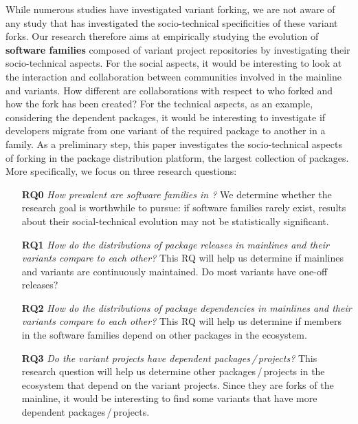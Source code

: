 While numerous studies have investigated variant forking, we are not aware of any study that has investigated the socio-technical specificities of these variant forks.
Our research therefore aims at empirically studying the evolution of \textbf{software families} composed of variant project repositories by investigating their socio-technical aspects.
For the social aspects, it would be interesting to look at the interaction and collaboration between communities involved in the mainline and variants.
How different are collaborations with respect to who forked and how the fork has been created?
For the technical aspects, as an example, considering the dependent packages, it would be interesting to investigate if developers migrate from one variant of the required package to another in a family.
As a preliminary step, this paper investigates the socio-technical aspects of forking in the \np package distribution platform, the largest collection of \js packages.
 More specifically, we focus on three research questions:
\begin{itemize}
\item[\textbf{RQ0}] \textit{How prevalent are software families in \np?}
We determine whether the research goal is worthwhile to pursue: if software families rarely exist, results about their social-technical evolution may not be statistically significant.

\item[\textbf{RQ1}] \textit{How do the distributions of package releases in mainlines and their variants compare to each other? }
This RQ will help us determine if mainlines and variants are continuously maintained.
Do most variants have one-off releases?

\item[\textbf{RQ2}] \textit{How do the distributions of package dependencies in mainlines and their variants compare to each other?}
This RQ will help us determine if members in the software families depend on other packages in the \np ecosystem.

\item[\textbf{RQ3}] \textit{Do the variant projects have dependent packages\,/\,projects?}
This research question will help us determine other packages\,/\,projects in the ecosystem that depend on the variant projects.
Since they are forks of the mainline, it would be interesting to find some variants that have more dependent packages\,/\,projects.
\end{itemize}

